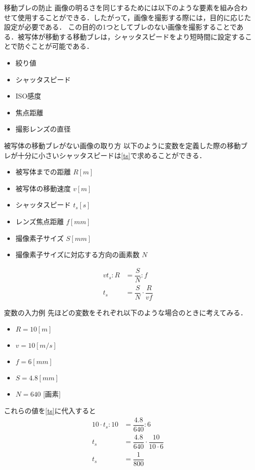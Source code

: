 \documentclass[8pt, jfont=ipaexm, t]{beamer} %
\begin{document}
\begin{frame}[allowframebreaks]{移動ブレの防止}
  画像の明るさを同じするためには以下のような要素を組み合わせて使用することができる．したがって，画像を撮影する際には，目的に応じた設定が必要である．
  この目的の1つとしてブレのない画像を撮影することである．被写体が移動する移動ブレは，シャッタスピードをより短時間に設定することで防ぐことが可能である．
  \begin{itemize}
    \item 絞り値
    \item シャッタスピード
    \item ISO感度
    \item 焦点距離
    \item 撮影レンズの直径
  \end{itemize}

  \newpage
  \begin{exampleblock}{被写体の移動ブレがない画像の取り方}
    \small
    以下のように変数を定義した際の移動ブレが十分に小さいシャッタスピードは\eqref{ts}で求めることができる．
    \begin{itemize}
      \item 被写体までの距離 $R[m]$
      \item 被写体の移動速度 $v[m]$
      \item シャッタスピード $t_s[s]$
      \item レンズ焦点距離 $f[mm]$
      \item 撮像素子サイズ $S[mm]$
      \item 撮像素子サイズに対応する方向の画素数 $N$
    \end{itemize}
    \begin{equation}\label{ts}
      \begin{split}
        vt_s : R &= \dfrac{S}{N} : f \\
        t_s &= \dfrac{S}{N} \cdot \dfrac{R}{vf}
      \end{split}
    \end{equation}
  \end{exampleblock}

  \newpage

  \begin{exampleblock}{変数の入力例}
    先ほどの変数をそれぞれ以下のような場合のときに考えてみる．
    \begin{itemize}
      \item $R = 10[m]$
      \item $ v = 10[m/s]$
      \item $f = 6[mm]$
      \item $S = 4.8[mm]$
      \item $N = 640$ $[$画素$]$
    \end{itemize}
    これらの値を\eqref{ts}に代入すると
    \begin{align*}
      10 \cdot t_s : 10 &= \dfrac{4.8}{640} : 6 \\
      t_s &= \dfrac{4.8}{640} \cdot \dfrac{10}{10 \cdot 6} \\
      t_s &= \dfrac{1}{800}
    \end{align*}
  \end{exampleblock}
\end{frame}
\end{document}
